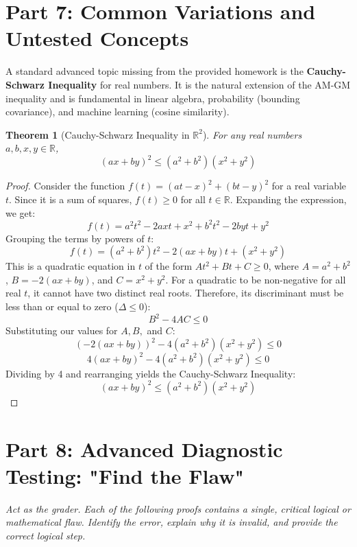\documentclass[11pt]{article}
\newtheorem{theorem}{Theorem}[section]
\newcommand{\R}{\mathbb{R}}
\begin{document}
\newpage
\section{Part 7: Common Variations and Untested Concepts}

A standard advanced topic missing from the provided homework is the \textbf{Cauchy-Schwarz Inequality} for real numbers. It is the natural extension of the AM-GM inequality and is fundamental in linear algebra, probability (bounding covariance), and machine learning (cosine similarity).

\begin{theorem}[Cauchy-Schwarz Inequality in $\R^2$]
For any real numbers $a, b, x, y \in \R$,
\[ (ax + by)^2 \le (a^2 + b^2)(x^2 + y^2) \]
\end{theorem}
\begin{proof}
Consider the function $f(t) = (at - x)^2 + (bt - y)^2$ for a real variable $t$.
Since it is a sum of squares, $f(t) \ge 0$ for all $t \in \R$.
Expanding the expression, we get:
\[ f(t) = a^2t^2 - 2axt + x^2 + b^2t^2 - 2byt + y^2 \]
Grouping the terms by powers of $t$:
\[ f(t) = (a^2 + b^2)t^2 - 2(ax + by)t + (x^2 + y^2) \]
This is a quadratic equation in $t$ of the form $At^2 + Bt + C \ge 0$, where $A = a^2+b^2$, $B = -2(ax+by)$, and $C = x^2+y^2$.
For a quadratic to be non-negative for all real $t$, it cannot have two distinct real roots. Therefore, its discriminant must be less than or equal to zero ($\Delta \le 0$):
\[ B^2 - 4AC \le 0 \]
Substituting our values for $A, B,$ and $C$:
\[ (-2(ax + by))^2 - 4(a^2 + b^2)(x^2 + y^2) \le 0 \]
\[ 4(ax + by)^2 - 4(a^2 + b^2)(x^2 + y^2) \le 0 \]
Dividing by 4 and rearranging yields the Cauchy-Schwarz Inequality:
\[ (ax + by)^2 \le (a^2 + b^2)(x^2 + y^2) \]
\end{proof}

\newpage
\section{Part 8: Advanced Diagnostic Testing: "Find the Flaw"}
\textit{Act as the grader. Each of the following proofs contains a single, critical logical or mathematical flaw. Identify the error, explain why it is invalid, and provide the correct logical step.}
\end{document}
